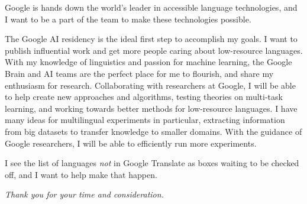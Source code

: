 \documentclass[12pt,a4paper]{article}
\begin{document}
Google is hands down the world's leader in accessible language technologies, and I want to be a part of the team to make these technologies possible. 

The Google AI residency is the ideal first step to accomplish my goals. I want to publish influential work and get more people caring about low-resource languages. With my knowledge of linguistics and passion for machine learning, the Google Brain and AI teams are the perfect place for me to flourish, and share my enthusiasm for research. Collaborating with researchers at Google, I will be able to help create new approaches and algorithms, testing theories on multi-task learning, and working towards better methods for low-resource languages. I have many ideas for multilingual experiments in particular, extracting information from big datasets to transfer knowledge to smaller domains. With the guidance of Google researchers, I will be able to efficiently run more experiments.

I see the list of languages \textit{not} in Google Translate as boxes waiting to be checked off, and I want to help make that happen.

\begin{center}
\textit{Thank you for your time and consideration.}  
\end{center}
\end{document}
